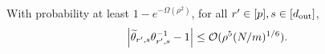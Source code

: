 




	
	
	
		
	
		\begin{claim}\label{claim:invtildethetatheta_proof}
			With probability at least $1-e^{-\Omega(\rho^2)}$, for all $r' \in [p], s \in [d_{\mathrm{out}} ]$,
			\begin{align*}
				\abs{\widetilde{\theta}_{r', s} \theta_{r', s}^{-1} - 1} \le \mathcal{O}(\rho^5 (N/m)^{1/6}).
			\end{align*}
		\end{claim}
		
